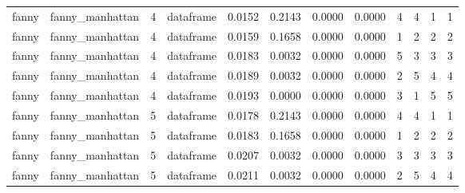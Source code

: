 {\begin{longtable}{| p{1cm} | p{1.8cm} | p{0.7cm} | p{0.9cm} | p{0.5cm} | p{0.65cm} | p{0.5cm} | p{0.5cm} | p{0.55cm} | p{0.55cm} | p{0.6cm} | p{0.5cm} |}
\cline{3-12}
\scriptsize   fanny   & \scriptsize  fanny\_manhattan & \scriptsize    4    & \scriptsize dataframe & \scriptsize    0.0152  &  \scriptsize 0.2143 & \scriptsize 0.0000 & \scriptsize    0.0000 & \scriptsize   4  & \scriptsize    4  & \scriptsize    1  & \scriptsize    1 \\
\scriptsize   fanny   & \scriptsize  fanny\_manhattan & \scriptsize    4    & \scriptsize dataframe & \scriptsize    0.0159  &  \scriptsize 0.1658 & \scriptsize 0.0000 & \scriptsize    0.0000 & \scriptsize   1  & \scriptsize    2  & \scriptsize    2  & \scriptsize    2 \\
\scriptsize   fanny   & \scriptsize  fanny\_manhattan & \scriptsize    4    & \scriptsize dataframe & \scriptsize    0.0183  &  \scriptsize 0.0032 & \scriptsize 0.0000 & \scriptsize    0.0000 & \scriptsize   5  & \scriptsize    3  & \scriptsize    3  & \scriptsize    3 \\
\scriptsize   fanny   & \scriptsize  fanny\_manhattan & \scriptsize    4    & \scriptsize dataframe & \scriptsize    0.0189  &  \scriptsize 0.0032 & \scriptsize 0.0000 & \scriptsize    0.0000 & \scriptsize   2  & \scriptsize    5  & \scriptsize    4  & \scriptsize    4 \\
\scriptsize   fanny   & \scriptsize  fanny\_manhattan & \scriptsize    4    & \scriptsize dataframe & \scriptsize    0.0193  &  \scriptsize 0.0000 & \scriptsize 0.0000 & \scriptsize    0.0000 & \scriptsize   3  & \scriptsize    1  & \scriptsize    5  & \scriptsize    5 \\
\cline{3-12}
\scriptsize   fanny   & \scriptsize  fanny\_manhattan & \scriptsize    5    & \scriptsize dataframe & \scriptsize    0.0178  &  \scriptsize 0.2143 & \scriptsize 0.0000 & \scriptsize    0.0000 & \scriptsize   4  & \scriptsize    4  & \scriptsize    1  & \scriptsize    1 \\
\scriptsize   fanny   & \scriptsize  fanny\_manhattan & \scriptsize    5    & \scriptsize dataframe & \scriptsize    0.0183  &  \scriptsize 0.1658 & \scriptsize 0.0000 & \scriptsize    0.0000 & \scriptsize   1  & \scriptsize    2  & \scriptsize    2  & \scriptsize    2 \\
\scriptsize   fanny   & \scriptsize  fanny\_manhattan & \scriptsize    5    & \scriptsize dataframe & \scriptsize    0.0207  &  \scriptsize 0.0032 & \scriptsize 0.0000 & \scriptsize    0.0000 & \scriptsize   3  & \scriptsize    3  & \scriptsize    3  & \scriptsize    3 \\
\scriptsize   fanny   & \scriptsize  fanny\_manhattan & \scriptsize    5    & \scriptsize dataframe & \scriptsize    0.0211  &  \scriptsize 0.0032 & \scriptsize 0.0000 & \scriptsize    0.0000 & \scriptsize   2  & \scriptsize    5  & \scriptsize    4  & \scriptsize    4 \\

\end{longtable}}
